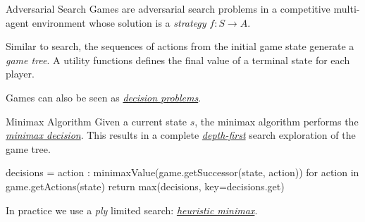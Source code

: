 \documentclass{cognito}
\begin{document}

\begin{note}{Adversarial Search}
	Games are adversarial search problems in a competitive multi-agent environment
	whose solution is a \emph{strategy} $f : S \to A$.
	\vspace{5pt}
	
	Similar to search, the sequences of actions from the initial game state generate a \emph{game tree}.
	A utility functions defines the final value of a terminal state for each player.
	\begin{remark} Games can also be seen as \hyperref[note:Stochastic Decision Problems]{\it decision problems}.
	\end{remark}
	\vspace{-5pt}
\end{note}



\begin{note}{Minimax Algorithm}
	Given a current state $s$, the minimax algorithm performs the \hyperref[note:Minimax Decision]{\emph{minimax decision}}.
	This results in a complete \hyperref[note:Depth-First Search]{\emph{depth-first}} search exploration of the game tree.
		\begin{code}
decisions = { 
	action : minimaxValue(game.getSuccessor(state, action))
	for action in game.getActions(state)
}
return max(decisions, key=decisions.get)
	\end{code}
	\begin{remark}
		In practice we use a \emph{ply} limited search: \hyperref[note:Heuristic Minimax]{\it heuristic minimax}.
	\end{remark}
	\vspace{-5pt}
\end{note}
\end{document}

